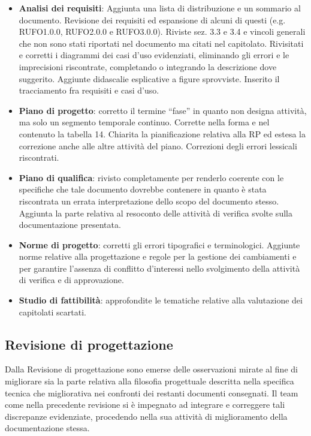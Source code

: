 \begin{itemize}
\item \textbf{Analisi dei requisiti}: Aggiunta una lista di distribuzione e un sommario al documento. Revisione dei requisiti ed espansione di alcuni di questi (e.g. RUFO1.0.0, RUFO2.0.0 e RUFO3.0.0). Riviste sez. 3.3 e 3.4 e vincoli generali che non sono stati riportati nel documento ma citati nel capitolato. Rivisitati e corretti i diagrammi dei casi d'uso evidenziati, eliminando gli errori e le imprecisioni riscontrate, completando o integrando la descrizione dove suggerito. Aggiunte didascalie esplicative a figure sprovviste. Inserito il tracciamento fra requisiti e casi d'uso.

\item \textbf{Piano di progetto}: corretto il termine ``fase'' in quanto non designa attività, ma solo un segmento temporale continuo. Corrette nella forma e nel contenuto la tabella 14. Chiarita la pianificazione relativa alla \underline{} RP ed estesa la correzione anche alle altre attività del piano. Correzioni degli errori lessicali riscontrati.

\item \textbf{Piano di qualifica}: rivisto completamente per renderlo coerente con le specifiche che tale documento dovrebbe contenere in quanto è stata riscontrata un errata interpretazione dello scopo del documento stesso.
Aggiunta la parte relativa al resoconto delle attività di verifica svolte sulla documentazione presentata.

\item \textbf{Norme di progetto}: corretti gli errori tipografici e terminologici. Aggiunte norme relative alla progettazione e regole per la gestione dei cambiamenti e per garantire l'assenza di conflitto d'interessi nello svolgimento della attività di verifica e di approvazione.

\item \textbf{Studio di fattibilità}: approfondite le tematiche relative alla valutazione dei capitolati scartati.
\end{itemize}

\subsection{Revisione di progettazione}
Dalla Revisione di progettazione sono emerse delle osservazioni mirate al fine di migliorare sia la parte relativa alla filosofia progettuale descritta nella specifica tecnica che migliorativa nei confronti dei restanti documenti consegnati. Il team come nella precedente revisione si è impegnato ad integrare e correggere tali discrepanze evidenziate, procedendo nella sua attività di miglioramento della documentazione stessa.

